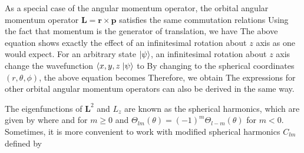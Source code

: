 As a special case of the angular momentum operator, the orbital angular momentum operator 
$\mathbf{L} = \mathbf{r} \times \mathbf{p}$ satisfies the same commutation relations
Using the fact that momentum is the generator of translation, we have
The above equation shows exactly the effect of an infinitesimal rotation about $z$ axis as one would expect. For an 
arbitrary state $| \psi \rangle$, an infinitesimal rotation about $z$ axis change the wavefunction $\left\langle x, y, z \right.| \psi \rangle$ to 
By changing to the spherical coordinates $(r, \theta, \phi)$, the above equation becomes
Therefore, we obtain
The expressions for other orbital angular momentum operators 
can also  be derived in the same way. 

The eigenfunctions of $\mathbf{L}^2$ and $L_z$ are known as the spherical harmonics, which are given by
where
and 
for $m\ge 0$ and $\Theta_{lm}(\theta) =(-1)^{m} \Theta_{l-m}(\theta) $ for $m<0$. Sometimes, it is more convenient
to work with modified spherical harmonics $C_{lm}$ defined by

